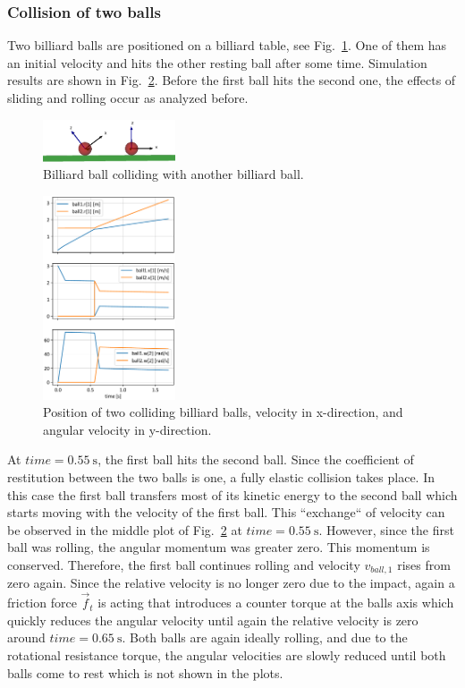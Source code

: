 \subsubsection*{Collision of two balls}

Two billiard balls are positioned on a billiard table, see Fig.~\ref{fig:twoCollidingBalls}.
One of them has an initial velocity and hits the other resting ball after some time.
Simulation results are shown in Fig.~\ref{fig:twoCollidingBalls_plot}.
Before the first ball hits the second one, the
effects of sliding and rolling occur as analyzed before.
%
\begin{figure}[b]
	\centering
	\includegraphics[width=0.35\textwidth]{figures/twoCollidingBalls.png}
	\caption{Billiard ball colliding with another billiard ball.}
	\label{fig:twoCollidingBalls}
\end{figure}
%
\begin{figure}[t]
	\centering
	\includegraphics[width=0.35\textwidth]{figures/twoCollidingBalls_plot.pdf}
	\caption{Position of two colliding billiard balls, velocity in x-direction, and angular velocity in y-direction.}
	\label{fig:twoCollidingBalls_plot}
\end{figure}
%
At $time = \SI{0.55}{\second}$, the first ball hits the second ball. Since the coefficient of restitution between the
two balls is one, a fully elastic collision takes place. In this case the first ball transfers most of its kinetic energy to the second ball which starts moving with the velocity of the first ball. This ``exchange`` of velocity
can be observed in the middle plot of Fig.~\ref{fig:twoCollidingBalls_plot} at $time = \SI{0.55}{\second}$. However, since the first ball
was rolling, the angular momentum was greater zero. This momentum is conserved. Therefore, the first ball continues rolling
and velocity $v_{ball,1}$ rises from zero again.
Since the relative velocity is no longer zero due to the impact, again a friction force $\vec{f}_t$ is acting
that introduces a counter torque at the balls axis which quickly reduces the angular velocity until again
the relative velocity is zero around $time = \SI{0.65}{\second}$. Both balls are again ideally rolling, and due to the
rotational resistance torque, the angular velocities are slowly reduced until both balls come to rest
which is not shown in the plots.
%




